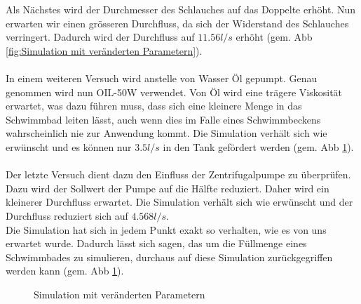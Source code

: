 Als Nächstes wird der Durchmesser des Schlauches auf das Doppelte erhöht. Nun erwarten wir einen grösseren Durchfluss, da sich der Widerstand des Schlauches verringert. Dadurch wird der Durchfluss auf $11.56 l/s$ erhöht (gem. Abb \ref{fig:Simulation mit veränderten Parametern}).\\
\\
In einem weiteren Versuch wird anstelle von Wasser Öl gepumpt. Genau genommen wird nun OIL-50W verwendet. Von Öl wird eine trägere Viskosität erwartet, was dazu führen muss, dass sich eine kleinere Menge in das Schwimmbad leiten lässt, auch wenn dies im Falle eines Schwimmbeckens wahrscheinlich nie zur Anwendung kommt. Die Simulation verhält sich wie erwünscht und es können nur $3.5 l/s$ in den Tank gefördert werden (gem. Abb \ref{fig:Simulation mit veränderten Parametern 2}).\\
\\
Der letzte Versuch dient dazu den Einfluss der Zentrifugalpumpe zu überprüfen. Dazu wird der Sollwert der Pumpe auf die Hälfte reduziert. Daher wird ein kleinerer Durchfluss erwartet. Die Simulation verhält sich wie erwünscht und der Durchfluss reduziert sich auf $4.568 l/s$.\\
Die Simulation hat sich in jedem Punkt exakt so verhalten, wie es von uns erwartet wurde. Dadurch lässt sich sagen, das um die Füllmenge eines Schwimmbades zu simulieren, durchaus auf diese Simulation zurückgegriffen werden kann (gem. Abb \ref{fig:Simulation mit veränderten Parametern 2}).

\begin{figure}[htb]
\caption{Simulation mit veränderten Parametern}
\label{fig:Simulation mit veränderten Parametern 2}
\end{figure}


